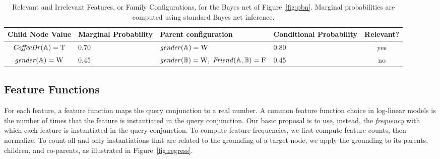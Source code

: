 \documentclass[twoside,11pt]{article}
\begin{document}
\begin{table}
\vspace{-2cm}
\caption{Relevant and Irrelevant Features, or Family Configurations, for the Bayes net of Figure~\ref{fig:pbn}. Marginal probabilities are computed using standard Bayes net inference.}
\begin{center}
 \begin{tabular}{@{} |c p{2cm}|p{3.5cm} p{2cm}|c|@{}}
 \hline
Child Node Value & Marginal Probability & Parent configuration & Conditional Probability & Relevant? \\\hline
$\it{CoffeeDr}(\mathbb{A}) = \mathrm{T}$ & 0.70 & $\it{gender}(\mathbb{A}) = \mathrm{W}$ & 0.80 & yes \\
$\it{gender}(\mathbb{A}) = \mathrm{W}$ & 0.45 & $\it{gender}(\mathbb{B}) = \mathrm{W},$ $\it{Friend}(\mathbb{A},\mathbb{B}) = \mathrm{F}$ & 0.45 & no \\\hline
\end{tabular}
\end{center}
\label{table:relevance}
\end{table}%



\subsection{Feature Functions} \label{sec:predictors}
For each feature, a feature function maps the query conjunction to a real number. A common feature function choice in log-linear models is the number of times that the feature is instantiated in the query conjunction. 
Our basic proposal is to use, instead, the {\em frequency} with which each feature
is instantiated in the query conjunction. 
%
To compute feature frequencies, we first compute feature counts, then normalize.
To count all and only instantiations that are related to the grounding of a target node, we apply the grounding to its parents, children, and co-parents, as illustrated in Figure~\ref{fig:regress}. 
\end{document}
